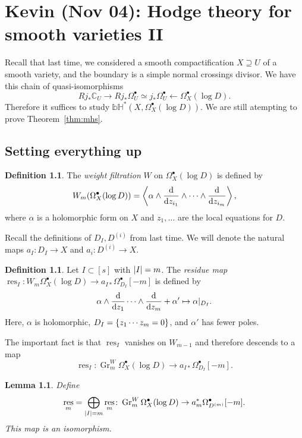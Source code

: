 \documentclass[leqno, openany]{memoir}
\newtheorem{lem}[thm]{Lemma}
\theoremstyle{definition}
\newtheorem{defn}[thm]{Definition}
\theoremstyle{remark}
\theoremstyle{plain}
\theoremstyle{definition}
\theoremstyle{remark}
\newcommand{\bH}{\mathbb{bH}}
\newcommand{\C}{\mathbb{C}}
\newcommand{\on}[1]{\operatorname{#1}}
\DeclareMathOperator{\res}{res}
\begin{document}
\chapter{Kevin (Nov 04): Hodge theory for smooth varieties II}%
\label{cha:kevin_nov_04_hodge_theory_for_smooth_varieties_ii}

Recall that last time, we considered a smooth compactification $X \supseteq U$ of a smooth variety, and the boundary is a simple normal crossings divisor. We have this chain of quasi-isomorphisms
\[ R j_* \C_U \to R j_* \Omega_U^{\bullet} \simeq j_* \Omega_U^{\bullet} \gets \Omega_X^{\bullet}(\log D). \]
Therefore it suffices to study $\bH^*(X, \Omega_X^{\bullet}(\log D))$. We are still atempting to prove Theorem~\ref{thm:mhs}.

\section{Setting everything up}%
\label{sec:setting_everything_up}

\begin{defn}
    The \textit{weight filtration} $W$ on $\Omega_X^{\bullet}(\log D)$ is defined by
    \[ W_m(\Omega_X^{\bullet}(\log D)) = \ev{ \alpha \wedge \dv{z_{i_1}} \wedge \cdots \wedge \dv{z_{i_m}}}, \]
    where $\alpha$ is a holomorphic form on $X$ and $z_1, \ldots$ are the local equations for $D$.
\end{defn}

Recall the definitions of $D_I, D^{(i)}$ from last time. We will denote the natural maps $a_I \colon D_I \to X$ and $a_i \colon D^{(i)} \to X$.

\begin{defn}
    Let $I \subset [s]$ with $\abs{I} = m$. The \textit{residue map} $\on{res}_I \colon W_m \Omega_X^{\bullet}(\log D) \to a_{I*} \Omega_{D_I}^{\bullet}[-m]$ is defined by
    \[ \alpha \wedge \dv{z_1} \cdots \wedge \dv{z_m} + \alpha' \mapsto \alpha |_{D_I}. \]
    Here, $\alpha$ is holomorphic, $D_I = \qty{z_1 \cdots z_m = 0}$, and $\alpha'$ has fewer poles.
\end{defn}

The important fact is that $\res_I$ vanishes on $W_{m-1}$ and therefore descends to a map
\[ \res_I \colon \on{Gr}_m^W \Omega_X^{\bullet}(\log D) \to a_{I*} \Omega^{\bullet}_{D_I}[-m]. \]

\begin{lem}
    Define
    \[ \res_m = \bigoplus_{\abs{I} = m} \res_m \colon \on{Gr}_m^W \Omega_X^{\bullet}(\log D) \to a_m^* \Omega_{D^{(m)}}^{\bullet} [-m]. \]
    This map is an isomorphism.
\end{lem}
\end{document}
